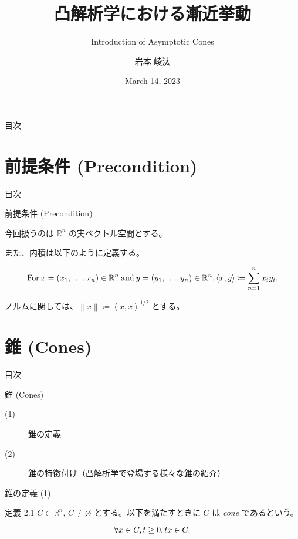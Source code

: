 \documentclass[aspectratio=169, dvipdfmx, 11pt]{beamer} %
\title[凸解析学における漸近挙動]{凸解析学における漸近挙動}
\subtitle{Introduction of Asymptotic Cones}
\author[岩本 崚汰]{岩本 崚汰}
\institute[新潟大学大学院]{新潟大学大学院自然科学研究科}
\date{March 14, 2023}
\begin{document}
\maketitle

\begin{frame}{目次}
    \tableofcontents
\end{frame}

\section{前提条件 (Precondition) }
\begin{frame}{目次}
    \tableofcontents[currentsection]
\end{frame}

\begin{frame}{前提条件 (Precondition) }

  今回扱うのは $\mathbb{R}^n$ の実ベクトル空間とする。

  また、内積は以下のように定義する。

  \begin{equation}
    \text{For}\: x=(x_1,\dots,x_n) \in \mathbb{R}^n \:\text{and}\: y=(y_1,\dots,y_n) \in \mathbb{R}^n, \left\langle x,y\right\rangle \coloneqq \sum_{n = 1}^{n} x_i y_i. \notag
  \end{equation}

  ノルムに関しては、$\left\lVert x \right\rVert \coloneqq \left\langle x,x\right\rangle ^{1/2} $ とする。

\end{frame}

\section{錐 (Cones) }
\begin{frame}{目次}
  \tableofcontents[currentsection]
\end{frame}

\begin{frame}{錐 (Cones) }
  \begin{description}
    \item[(1)] 錐の定義
    \item[(2)] 錐の特徴付け（凸解析学で登場する様々な錐の紹介）
  \end{description}
\end{frame}

\begin{frame}{錐の定義 (1) }
  \begin{block}{定義 2.1}
    $C \subset \mathbb{R}^n$, $C \neq \varnothing$ とする。以下を満たすときに $C$ は \textit{cone} であるという。

    \begin{equation}
      \forall x \in C, t \geq 0, tx \in C. \notag
    \end{equation}

  \end{block}
\end{frame}
\end{document}
